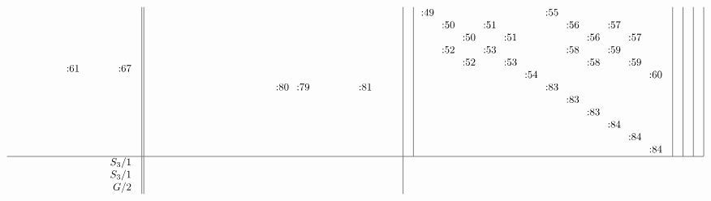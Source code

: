 \documentclass[12pt,a4paper]{amsart}
\begin{document}
\begin{align*}
\begin{array}{r||c|c|c|c|c|c|c}
\begin{array}{cccccccccc}
\\
\\
\\
&&&&&\llap:61&&&&\llap:67\\
\\
\\
\\
\\
\\
  \end{array}
&
  \begin{array}{cccccccccccc}
\phantom{51}&\phantom{52}&\phantom{53}&\phantom{54}&\phantom{55}&\phantom{56}&\phantom{57}&\phantom{58}&\phantom{59}&\phantom{60}&\phantom{61}&\phantom{62}\\
\\
\\
\\
\\
\\
&&&&&&\llap:80&\llap:79&&&\llap:81&\\
\\
\\
\\
\\
\\
  \end{array}
&
&
  \begin{array}{cccccccccccc}
\llap:49&&&&&&\llap:55&&&&&\\
&\llap:50&&\llap:51&&&&\llap:56&&\llap:57&&\\
&&\llap:50&&\llap:51&&&&\llap:56&&\llap:57&\\
&\llap:52&&\llap:53&&&&\llap:58&&\llap:59&&\\
&&\llap:52&&\llap:53&&&&\llap:58&&\llap:59&\\
&&&&&\llap:54&&&&&&\llap:60\\
&&&&&&\llap:83&&&&&\\
&&&&&&&\llap:83&&&&\\
&&&&&&&&\llap:83&&&\\
&&&&&&&&&\llap:84&&\\
&&&&&&&&&&\llap:84&\\
&&&&&&&&&&&\llap:84\\
  \end{array}
&&&\\\hline
    \begin{array}{r}
      S_3/1 \\ S_3/1 \\ G/2
    \end{array}
&
  \begin{array}{cccccccccc}

\end{array}
\end{array}
\end{align*}
\end{document}
